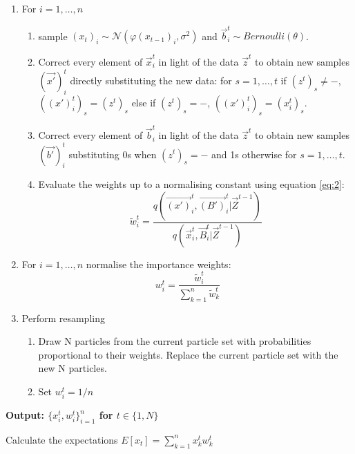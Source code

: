 \begin{algorithm}[H]
\begin{algorithmic}
\begin{enumerate}
	\item For $i = 1, \dots , n$
	\begin{enumerate}
  		\item sample $(x_t)_i \sim \mathcal{N} (\varphi (x_{t-1})_i, \sigma^{2})$ and $\vec{b}^t_{i} \sim Bernoulli(\theta)$.
		\item {Correct every element of $\vec{x}^t_i$ in light of the data $\vec{z}^t$ to obtain new samples $(\vec{x'})^t_i$ directly substituting the new data: for $s = 1, \dots ,t$ if $(z^t)_s \neq -$, $((x')_i^t)_s = (z^t)_s$ else if $(z^t)_s = -$, $((x')_i^t)_s = (x^t_i)_s$.}
		\item {Correct every element of $\vec{b}_i^t$ in light of the data $\vec{z}^t$ to obtain new samples $(\vec{b'})^t_i$ substituting 0s when $(z^t)_s = -$ and 1s otherwise for $s = 1, \dots, t$.}
		\item Evaluate the weights up to a normalising constant using equation \ref{eq:2}:
		\[
		\tilde{w}^{t}_{i} = \frac{q(\vec{(x')}^{t}_i, \vec{(B')}^{t}_i | \vec{Z}^{t-1})}{q(\vec{x}^{t}_i, \vec{B}^{t}_i | \vec{Z}^{t-1})}
		\]
	\end{enumerate}
	\item For $i = 1, \dots , n$ normalise the importance weights:
	\[
	w^{t}_{i} = \frac{\tilde{w}^t_i}{\sum_{k=1}^{n}\tilde{w}^{t}_k}
	\]
	\item Perform resampling
	\begin{enumerate}
	    \item Draw N particles from the current particle set with probabilities proportional to their weights. Replace the current particle set with the new N particles.
	    \item Set $w^t_i=1/n$
	\end{enumerate}
\end{enumerate}

\State  \bf{Output:} \normalfont $\Big \{ x^{t}_{i} , w^{t}_{i} \Big \}_{i = 1}^{n}$ for $t \in \{ 1, N \}$

\item Calculate the expectations  $E[x_t] = \sum_{k=1}^{n} x^{t}_k w_{k}^{t}$
  
 \end{algorithmic}
\end{algorithm}

